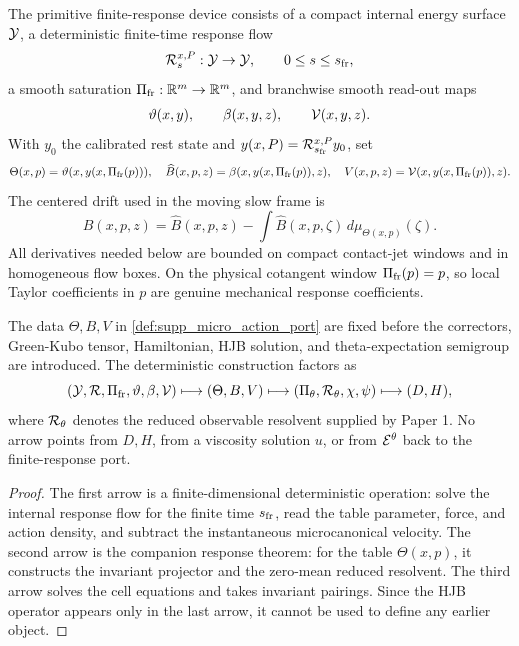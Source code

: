 \begin{definition}
\label{def:supp_micro_action_port}
The primitive finite-response device consists of a compact internal energy
surface \(\mathcal Y\), a deterministic finite-time response flow
\[
  \mathcal R_s^{x,P}:\mathcal Y\to\mathcal Y,\qquad 0\le s\le s_{\rm fr},
\]
a smooth saturation \(\Pi_{\rm fr}:\mathbb R^m\to\mathbb R^m\), and branchwise smooth read-out
maps
\[
  \vartheta(x,y),\qquad
  \beta(x,y,z),\qquad
  \mathcal V(x,y,z).
\]
With \(y_0\) the calibrated rest state and
\(y(x,P)=\mathcal R_{s_{\rm fr}}^{x,P}y_0\), set
\[
  \Theta(x,p)=\vartheta(x,y(x,\Pi_{\rm fr}(p))),\quad
  \widehat B(x,p,z)=\beta(x,y(x,\Pi_{\rm fr}(p)),z),\quad
  V(x,p,z)=\mathcal V(x,y(x,\Pi_{\rm fr}(p)),z).
\]
The centered drift used in the moving slow frame is
\[
  B(x,p,z)=\widehat B(x,p,z)
   -\int \widehat B(x,p,\zeta)\,d\mu_{\Theta(x,p)}(\zeta).
\]
All derivatives needed below are bounded on compact contact-jet windows and in
homogeneous flow boxes.  On the physical cotangent window
\(\Pi_{\rm fr}(p)=p\), so local Taylor coefficients in \(p\) are genuine
mechanical response coefficients.
\end{definition}

\begin{proposition}
\label{prop:supp_no_effective_feedback}
The data \(\Theta,B,V\) in \cref{def:supp_micro_action_port} are fixed before
the correctors, Green-Kubo tensor, Hamiltonian, HJB solution, and
theta-expectation semigroup are introduced.  The deterministic construction
factors as
\[
  (\mathcal Y,\mathcal R,\Pi_{\rm fr},\vartheta,\beta,\mathcal V)
  \longmapsto
  (\Theta,B,V)
  \longmapsto
  (\Pi_\theta,\mathcal R_\theta,\chi,\psi)
  \longmapsto
  (D,H),
\]
where \(\mathcal R_\theta\) denotes the reduced observable resolvent supplied by
Paper 1.  No arrow points from \(D,H\), from a viscosity solution \(u\), or from
\(\mathcal E^\theta\) back to the finite-response port.
\end{proposition}

\begin{proof}
The first arrow is a finite-dimensional deterministic operation: solve the
internal response flow for the finite time \(s_{\rm fr}\), read the table
parameter, force, and action density, and subtract the instantaneous
microcanonical velocity.  The second arrow is the companion response theorem:
for the table \(\Theta(x,p)\), it constructs the invariant projector and the
zero-mean reduced resolvent.  The third arrow solves the cell equations and
takes invariant pairings.  Since the HJB operator appears only in the last
arrow, it cannot be used to define any earlier object.
\end{proof}

